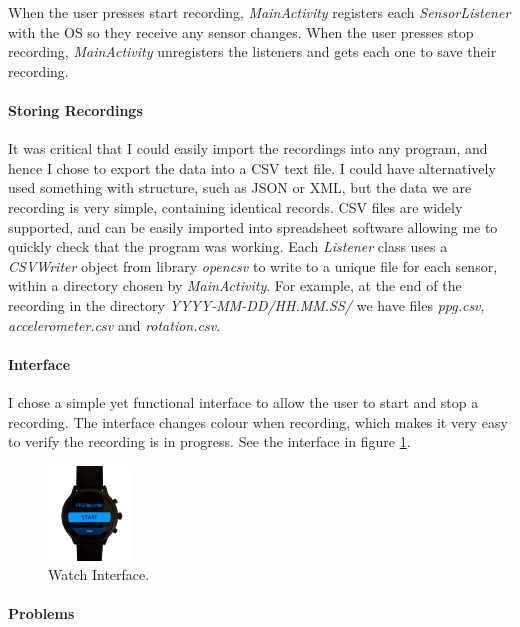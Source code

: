 \documentclass[12pt,a4paper,twoside,openright]{report}
\begin{document}
When the user presses start recording, \emph{MainActivity} registers each
\emph{SensorListener} with the OS so they receive any sensor changes.
When the user presses stop recording, \emph{MainActivity} unregisters the
listeners and gets each one to save their recording.

\paragraph{Storing Recordings}

It was critical that I could easily import the recordings into any program, and
hence I chose to export the data into a CSV text file. I could have
alternatively used something with structure, such as JSON or XML, but the
data we are recording is very simple, containing identical records. CSV files
are widely supported, and can be easily imported into spreadsheet software
allowing me to quickly check that the program was working. Each \emph{Listener}
class uses a \emph{CSVWriter} object from library \emph{opencsv} to write to a
unique file for each sensor, within a directory chosen by \emph{MainActivity}.
For example, at the end of the recording in the directory
\emph{YYYY-MM-DD/HH.MM.SS/} we have files \emph{ppg.csv},
\emph{accelerometer.csv} and \emph{rotation.csv}.

\paragraph{Interface}

I chose a simple yet functional interface to allow the user to start and stop
a recording. The interface changes colour when recording, which makes it very
easy to verify the recording is in progress. See the interface in figure
\ref{fig:interface}.

\begin{figure}[tbh]
	\centerline{\includegraphics[width=0.2\textwidth]{figs/interface.png}}
	\caption{Watch Interface.}
	\label{fig:interface}
\end{figure}



\paragraph{Problems}
\end{document}
